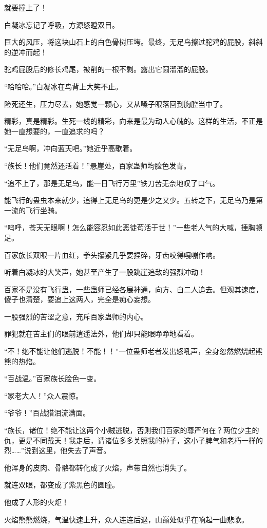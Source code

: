 \begin{this_body}
就要撞上了！

白凝冰忘记了呼吸，方源怒瞪双目。

巨大的风压，将这块山石上的白色骨树压垮。最终，无足鸟擦过驼鸡的屁股，斜斜的逆冲而起！

驼鸡屁股后的修长鸡尾，被削的一根不剩。露出它圆溜溜的屁股。

“哈哈哈。”白凝冰在鸟背上大笑不止。

险死还生，压力尽去，她感觉一颗心，又从嗓子眼落回到胸腔当中了。

精彩，真是精彩。生死一线的精彩，向来是最为动人心魄的。这样的生活，不正是她一直想要的，一直追求的吗？

“无足鸟啊，冲向蓝天吧。”她近乎高歌着。

“族长！他们竟然还活着！”悬崖处，百家蛊师均脸色发青。

“追不上了，那是无足鸟，能一日飞行万里”铁刀苦无奈地叹了口气。

能飞行的蛊虫本来就少，追得上无足鸟的更是少之又少。五转之下，无足鸟乃是第一流的飞行坐骑。

“呜呼，苍天无眼啊！怎么能容忍如此恶徒苟活于世！”一些老人气的大喊，捶胸顿足。

百家族长双眼一片血红，拳头攥紧几乎要捏碎，牙齿咬得嘎嘣作响。

听着白凝冰的大笑声，她甚至产生了一股跳崖追敌的强烈冲动！

百家不是没有飞行蛊，一些蛊师已经各展神通，向方、白二人追去。但观其速度，傻子也清楚，要追上这两人，完全是痴心妄想。

一股强烈的苦涩之意，充斥百家蛊师的内心。

罪犯就在苦主们的眼前逍遥法外，他们却只能眼睁睁地看着。

“不！绝不能让他们逃脱！不能！！”一位蛊师老者发出怒吼声，全身忽然燃烧起熊熊的热焰。

“百战温。”百家族长脸色一变。

“家老大人！”众人震惊。

“爷爷！”百战猎泪流满面。

“族长，诸位！绝不能让这两个小贼逃脱，否则我们百家的尊严何在？两位少主的仇，更是不同戴天！我走后，请诸位多多关照我的孙子，这小子脾气和老朽一样的烈……”说到这里，他失去了声音。

他浑身的皮肉、骨骼都转化成了火焰，声带自然也消失了。

就连双眼，都变成了紫黑色的圆瞳。

他成了人形的火炬！

火焰熊熊燃烧，气温快速上升，众人连连后退，山巅处似乎在响起一曲悲歌。


\end{this_body}
